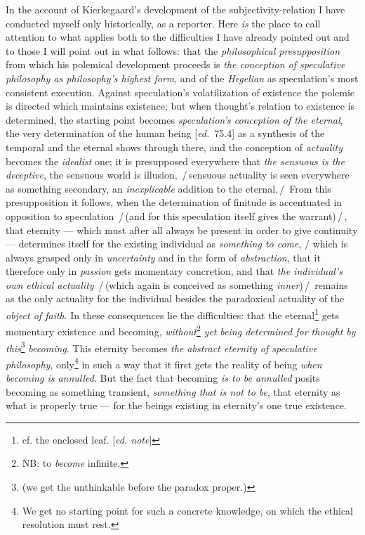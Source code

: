 \documentclass[12pt,a4paper,openany]{book}
\newcommand{\kpage}[1]{\marginnote{\footnotesize\textit{[#1]}}}
\newcommand{\ed}[1]{{\small[\textit{ed.}\ #1]}}
\newcommand{\ednote}[1]{{\small[\textit{ed. note}]}}
\newcommand{\ins}[1]{\,/\,#1\,/\,}
\begin{document}
In the account of Kierkegaard's development of the subjectivity-relation
I have conducted myself only historically, as a reporter. Here \emph{is}
the place to call attention to what applies
both to the difficulties I have already pointed out and to those
I will point out in what follows: that the \emph{philosophical presupposition} from
which his polemical development proceeds is \emph{the conception of speculative
philosophy as philosophy's highest form}, and of the \emph{Hegelian} as
speculation's most consistent execution. Against speculation's
volatilization of existence the polemic is directed which maintains existence;
but when thought's relation to existence is determined, the
starting point becomes \emph{speculation's conception of the eternal}, the very determination\kpage{170}
of the human being \ed{75.4} as a synthesis of the temporal and the eternal
shows through there, and the conception of \emph{actuality} becomes the \emph{idealist} one;
it is presupposed everywhere that \emph{the sensuous is the deceptive}, the
sensuous world is illusion, \ins{sensuous actuality is seen
everywhere as something secondary, an \emph{inexplicable} addition to the eternal.} From
this presupposition it follows, when the determination of finitude is accentuated
in opposition to speculation \ins{(and for this speculation
itself gives the warrant)}, that eternity --- which must after all always
be present in order to give continuity --- determines itself for the existing individual
as \emph{something to come}, / which is always grasped only in \emph{uncertainty} and in
the form of \emph{abstraction}, that it therefore only in \emph{passion} gets momentary concretion,
and that \emph{the individual's own ethical actuality} \ins{(which again is conceived as
something \emph{inner})} remains as the only actuality for the individual
besides the paradoxical actuality of the \emph{object of faith}. In these consequences
lie the difficulties: that the eternal\footnote[121]{cf. the enclosed leaf.
\ednote{}}
gets momentary existence
and becoming, \emph{without}\footnote[122]{NB: to \emph{become} infinite.} \emph{yet being determined for thought by this}\footnote[123]{(we get the unthinkable before the paradox proper.)} \emph{becoming}.
This eternity becomes \emph{the abstract eternity of speculative philosophy}, only\footnote[124]{We get no starting point for such a concrete knowledge, on which the ethical
resolution must rest.}
in such a way that it first gets the reality of being \emph{when becoming is annulled}. But
the fact that becoming \emph{is to be annulled} posits becoming as something transient, \emph{something that
is not to be}, that eternity as what is properly true --- for the beings existing in eternity's
one true existence.
\end{document}
